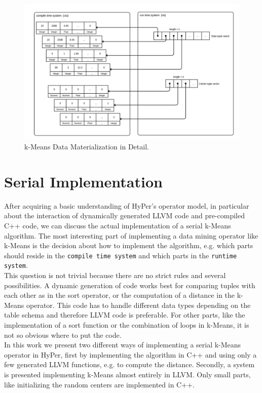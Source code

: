 \begin{figure}[htsb]
  \centering
  \includegraphics[scale=0.25]{figures/mat3}
  \caption[k-Means Data Materialization in Detail]{k-Means Data Materialization in Detail.}
  \label{fig:mat3}
\end{figure}




\section{Serial Implementation}\label{section:serial_implementation}

After acquiring a basic understanding of HyPer’s operator model, in particular about the interaction of dynamically generated LLVM code and pre-compiled C++ code, we can discuss the actual implementation of a serial k-Means algorithm. The most interesting part of implementing a data mining operator like k-Means is the decision about how to implement the algorithm, e.g. which parts should reside in the \texttt{compile time system} and which parts in the \texttt{runtime system}. 
\\
This question is not trivial because there are no strict rules and several possibilities. A dynamic generation of code works best for comparing tuples with each other as in the sort operator, or the computation of a distance in the k-Means operator. This code has to handle different data types depending on the table schema and therefore LLVM code is preferable. For other parts, like the implementation of a sort function or the combination of loops in k-Means, it is not so obvious where to put the code.
\\
In this work we present two different ways of implementing a serial k-Means operator in HyPer, first by implementing the algorithm in C++ and using only a few generated LLVM functions, e.g. to compute the distance. Secondly, a system is presented implementing k-Means almost entirely in LLVM. Only small parts, like initializing the random centers are implemented in C++.



